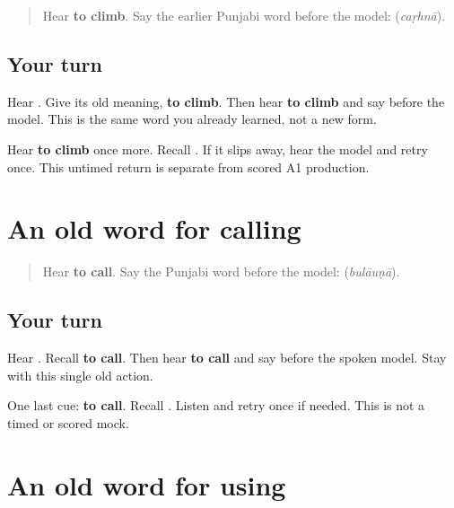 \label{lesson:PA-R161-climb-again}



\begin{quote}
Hear \textbf{to climb}. Say the earlier Punjabi word before the model: \textbf{} (\emph{caṛhnā}).
\end{quote}

\subsection*{Your turn}
Hear \textbf{}. Give its old meaning, \textbf{to climb}. Then hear \textbf{to climb} and say \textbf{} before the model. This is the same word you already learned, not a new form.

\begin{tcolorbox}[breakable,colback=teal!4,colframe=teal!35!black,title={Before you move on}]
Hear \textbf{to climb} once more. Recall \textbf{}. If it slips away, hear the model and retry once. This untimed return is separate from scored A1 production.
\end{tcolorbox}
\section[\texorpdfstring{\pa{ਬੁਲਾਉਣਾ} (bulāuṇā)}{ਬੁਲਾਉਣਾ (bulāuṇā)}]{An old word for calling}

\label{lesson:PA-R161-call-again}



\begin{quote}
Hear \textbf{to call}. Say the Punjabi word before the model: \textbf{} (\emph{bulāuṇā}).
\end{quote}

\subsection*{Your turn}
Hear \textbf{}. Recall \textbf{to call}. Then hear \textbf{to call} and say \textbf{} before the spoken model. Stay with this single old action.

\begin{tcolorbox}[breakable,colback=teal!4,colframe=teal!35!black,title={Before you move on}]
One last cue: \textbf{to call}. Recall \textbf{}. Listen and retry once if needed. This is not a timed or scored mock.
\end{tcolorbox}
\section[\texorpdfstring{\pa{ਵਰਤਣਾ} (vartṇā)}{ਵਰਤਣਾ (vartṇā)}]{An old word for using}

